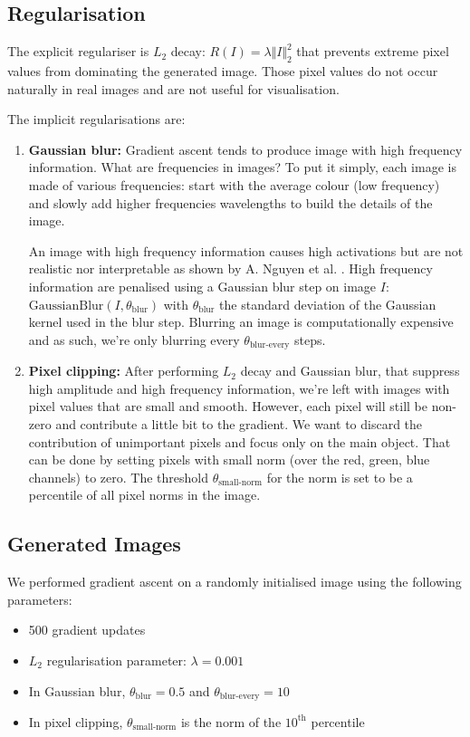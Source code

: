 \subsection{Regularisation}

The explicit regulariser is $L_2$ decay: $R(I) = \lambda \Vert I \Vert_2^2$ that prevents extreme pixel values from dominating the generated image. Those pixel values do not occur naturally in real images and are not useful for visualisation.

The implicit regularisations are: \cite{class-vis2}
\begin{enumerate}
    \item \textbf{Gaussian blur:} Gradient ascent tends to produce image with high frequency information. What are frequencies in images? To put it simply, each image 
    is made of various frequencies: start with the average colour (low frequency) and slowly add higher frequencies wavelengths to build the details of the image.
    
    An image with high frequency information causes high activations but are not realistic nor interpretable as shown by A. Nguyen et al. \cite{nguyen}. High frequency 
    information are penalised using a Gaussian blur step on image $I$: $\text{GaussianBlur}(I, \theta_{\text{blur}})$ with $\theta_{\text{blur}}$ the standard deviation of the 
    Gaussian kernel used in the blur step. Blurring an image is computationally expensive and as such, we're only blurring every $\theta_{\text{blur-every}}$ steps.
    \item \textbf{Pixel clipping:} After performing $L_2$ decay and Gaussian blur, that suppress high amplitude and high frequency information, we're left with images 
    with pixel values that are small and smooth. However, each pixel will still be non-zero and contribute a little bit to the gradient. We want to discard the contribution of 
    unimportant pixels and focus only on the main object. That can be done by setting pixels with small norm (over the red, green, blue channels) to zero. The threshold  
    $\theta_{\text{small-norm}}$ for the norm is set to be a percentile of all pixel norms in the image.
\end{enumerate}

\subsection{Generated Images}

We performed gradient ascent on a randomly initialised image using the following parameters:
\begin{itemize}[topsep=0pt]
    \itemsep-1em
    \item 500 gradient updates
    \item $L_2$ regularisation parameter: $\lambda = 0.001$
    \item In Gaussian blur, $\theta_{\text{blur}} = 0.5$ and $\theta_{\text{blur-every}} = 10$
    \item In pixel clipping, $\theta_{\text{small-norm}}$ is the norm of the $10^{\text{th}}$ percentile
\end{itemize}

